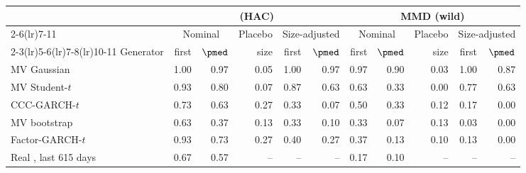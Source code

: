 \begin{tabular}{lrrrrrrrrrr}
\toprule
 & \multicolumn{5}{c}{\WC{} (HAC)} & \multicolumn{5}{c}{MMD (wild)} \\
\cmidrule(lr){2-6}\cmidrule(lr){7-11}
 & \multicolumn{2}{c}{Nominal} & Placebo & \multicolumn{2}{c}{Size-adjusted} & \multicolumn{2}{c}{Nominal} & Placebo & \multicolumn{2}{c}{Size-adjusted} \\
\cmidrule(lr){2-3}\cmidrule(lr){5-6}\cmidrule(lr){7-8}\cmidrule(lr){10-11}
Generator & first & $\pmed$ & size & first & $\pmed$ & first & $\pmed$ & size & first & $\pmed$ \\
\midrule
MV Gaussian & 1.00 & 0.97 & 0.05 & 1.00 & 0.97 & 0.97 & 0.90 & 0.03 & 1.00 & 0.87 \\
MV Student-$t$ & 0.93 & 0.80 & 0.07 & 0.87 & 0.63 & 0.63 & 0.33 & 0.00 & 0.77 & 0.63 \\
CCC-GARCH-$t$ & 0.73 & 0.63 & 0.27 & 0.33 & 0.07 & 0.50 & 0.33 & 0.12 & 0.17 & 0.00 \\
MV bootstrap & 0.63 & 0.37 & 0.13 & 0.33 & 0.10 & 0.33 & 0.07 & 0.13 & 0.03 & 0.00 \\
Factor-GARCH-$t$ & 0.93 & 0.73 & 0.27 & 0.40 & 0.27 & 0.37 & 0.13 & 0.10 & 0.13 & 0.00 \\
\midrule
Real \TRAIN{}, last 615 days & 0.67 & 0.57 & -- & -- & -- & 0.17 & 0.10 & -- & -- & -- \\
\bottomrule
\end{tabular}
